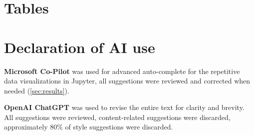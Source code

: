 \appendix

\chapter{Tables}

\begin{table}[h!]
\centering
\caption{Sr and Ba concentrations with errors and ratios from XRF measurements. 
The Compton ratio indicates 
reproducibility of the results. Values between 0.9 and 1.1 are good, 0.8 to 0.9 require
additional input to interpret quantitatively, and ratios below 0.8 can only be interpreted 
qualitatively.}\label{tab:sr-ba-table}

\end{table}

\begin{table}
\centering
\caption{Sr and Ba concentrations with errors and ratios from \ICPMS measurements. The BCR-2 standard should show
$337\pm 7$\,ppm Sr and $684\pm 5$\,ppm Ba.}\label{tab:sr-ba-icpms-table}

\end{table}

\begin{table}
\centering
\caption{S and TOC concentrations from XRF and IRMS with errors and ratios.}\label{tab:s-toc-table}

\end{table}

\begin{table}
\centering
\caption{S and TOC concentrations from \ICPMS and IRMS with errors and ratios.}\label{tab:s-toc-icpms-table}

\end{table}

\chapter{Declaration of AI use}


\setlength{\parindent}{0pt}

\textbf{Microsoft Co-Pilot} was used for advanced auto-complete for the repetitive data visualizations in 
Jupyter, all suggestions were reviewed and corrected when needed (\cref{sec:results}).

\textbf{OpenAI ChatGPT} was used to revise the entire text for clarity and brevity. All suggestions were reviewed,
content-related suggestions were discarded, approximately 80\% of style suggestions were discarded.